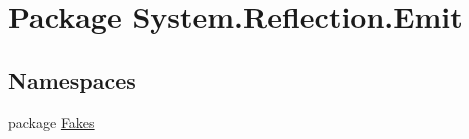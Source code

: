 \hypertarget{namespace_system_1_1_reflection_1_1_emit}{\section{Package System.\-Reflection.\-Emit}
\label{namespace_system_1_1_reflection_1_1_emit}
}
\subsection*{Namespaces}
\begin{DoxyCompactItemize}
\item 
package \hyperlink{namespace_system_1_1_reflection_1_1_emit_1_1_fakes}{Fakes}
\end{DoxyCompactItemize}
